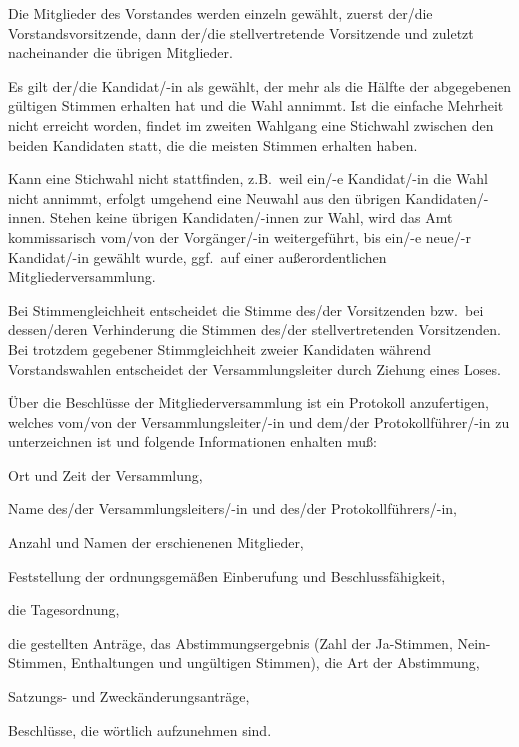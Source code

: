 \documentclass[draft]{scrartcl}
\begin{document}
\begin{contract}
Die Mitglieder des Vorstandes werden einzeln gewählt, zuerst der/die
Vorstandsvorsitzende, dann der/die stellvertretende Vorsitzende und zuletzt
nacheinander die übrigen Mitglieder.

Es gilt der/die Kandidat/-in als gewählt, der mehr als die Hälfte der
abgegebenen gültigen Stimmen erhalten hat und die Wahl annimmt. Ist die
einfache Mehrheit nicht erreicht worden, findet im zweiten Wahlgang eine
Stichwahl zwischen den beiden Kandidaten statt, die die meisten Stimmen
erhalten haben.

Kann eine Stichwahl nicht stattfinden, z.B.\ weil ein/-e Kandidat/-in die Wahl
nicht annimmt, erfolgt umgehend eine Neuwahl aus den übri\-gen
Kandidaten/-innen. Stehen keine übri\-gen Kandidaten/-innen zur Wahl, wird das
Amt kommissarisch vom/von der Vorgänger/-in weitergeführt, bis ein/-e neue/-r
Kandidat/-in gewählt wurde, ggf.\ auf einer außerordentlichen
Mitgliederversammlung.

Bei Stimmengleichheit entscheidet die Stimme des/der Vorsitzenden bzw.\ bei
dessen/deren Verhinderung die Stimmen des/der stellvertretenden Vorsitzenden. Bei
trotzdem gegebener Stimmgleichheit zweier Kandidaten während Vorstandswahlen
entscheidet der Versammlungsleiter durch Ziehung eines Loses.


Über die Beschlüsse der Mitgliederversammlung ist ein Protokoll anzufertigen,
welches vom/von der Versammlungsleiter/-in und dem/der Protokollführer/-in zu
unterzeichnen ist und folgende Informationen enhalten muß:
\begin{compactenum}[\hspace{2em}1.]
  \item Ort und Zeit der Versammlung,
  \item Name des/der Versammlungsleiters/-in und des/der Protokollführers/-in,
  \item Anzahl und Namen der erschienenen Mitglieder,
  \item Feststellung der ordnungsgemäßen Einberufung und Beschlussfähigkeit,
  \item die Tagesordnung,
  \item die gestellten Anträge, das Abstimmungsergebnis (Zahl der Ja-Stimmen,
    Nein-Stimmen, Enthaltungen und ungültigen Stimmen), die Art der
    Abstimmung,
  \item Satzungs- und Zweckänderungsanträge,
  \item Beschlüsse, die wörtlich aufzunehmen sind.
\end{compactenum}


\end{contract}
\end{document}

